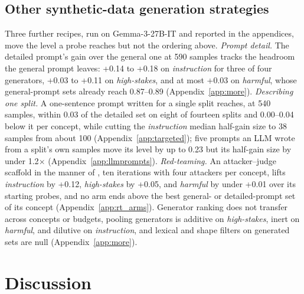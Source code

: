 \documentclass{article} %
\newcommand{\hs}{\emph{high-stakes}}
\newcommand{\harm}{\emph{harmful}}
\newcommand{\instr}{\emph{instruction}}
\begin{document}
\subsection{Other synthetic-data generation strategies}
\label{sec:other}
Three further recipes, run on Gemma-3-27B-IT and reported in the appendices, move the level a probe reaches but not the ordering above. \emph{Prompt detail.} The detailed prompt's gain over the general one at 590 samples tracks the headroom the general prompt leaves: +0.14 to +0.18 on \instr{} for three of four generators, +0.03 to +0.11 on \hs{}, and at most +0.03 on \harm{}, whose general-prompt sets already reach 0.87--0.89 (Appendix~\ref{app:more}). \emph{Describing one split.} A one-sentence prompt written for a single split reaches, at 540 samples, within 0.03 of the detailed set on eight of fourteen splits and 0.00--0.04 below it per concept, while cutting the \instr{} median half-gain size to 38 samples from about 100 (Appendix~\ref{app:targeted}); five prompts an LLM wrote from a split's own samples move its level by up to 0.23 but its half-gain size by under 1.2$\times$ (Appendix~\ref{app:llmprompts}). \emph{Red-teaming.} An attacker--judge scaffold in the manner of \citet{blandfort2025redteaming}, ten iterations with four attackers per concept, lifts \instr{} by +0.12, \hs{} by +0.05, and \harm{} by under +0.01 over its starting probes, and no arm ends above the best general- or detailed-prompt set of its concept (Appendix~\ref{app:rt_arms}). Generator ranking does not transfer across concepts or budgets, pooling generators is additive on \hs{}, inert on \harm{}, and dilutive on \instr{}, and lexical and shape filters on generated sets are null (Appendix~\ref{app:more}).

\section{Discussion}
\label{sec:discussion}
\end{document}

